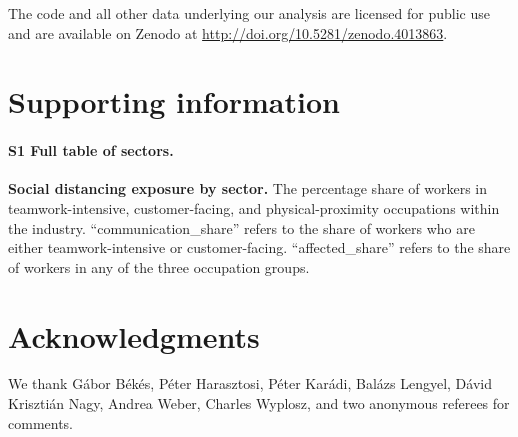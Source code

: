 \documentclass[10pt,letterpaper]{article}
\begin{document}
The code and all other data underlying our analysis are licensed for public use and are available on Zenodo at \url{http://doi.org/10.5281/zenodo.4013863}. 

\section*{Supporting information}

\paragraph*{S1 Full table of sectors.}
\label{S1_File}
{\bf Social distancing exposure by sector.} The percentage share of workers in teamwork-intensive, customer-facing, and physical-proximity occupations within the industry. ``communication\_share'' refers to the share of workers who are either teamwork-intensive or customer-facing. ``affected\_share'' refers to the share of workers in any of the three occupation groups.

\section*{Acknowledgments}
We thank Gábor Békés, Péter Harasztosi, Péter Karádi, Balázs Lengyel, Dávid Krisztián Nagy, Andrea Weber, Charles Wyplosz, and two anonymous referees for comments.

\nolinenumbers



 
\end{document}
